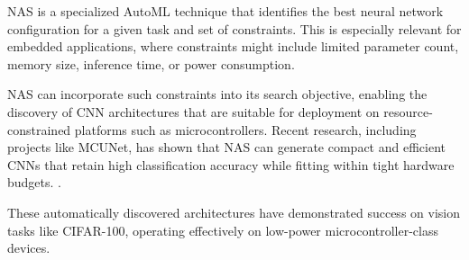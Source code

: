 NAS is a specialized AutoML technique that identifies the best neural network configuration for a given task and set of constraints. This is especially relevant for embedded applications, where constraints might include limited parameter count, memory size, inference time, or power consumption.

NAS can incorporate such constraints into its search objective, enabling the discovery of CNN architectures that are suitable for deployment on resource-constrained platforms such as microcontrollers. Recent research, including projects like MCUNet, has shown that NAS can generate compact and efficient CNNs that retain high classification accuracy while fitting within tight hardware budgets. \cite{pau2023quantitative}.

These automatically discovered architectures have demonstrated success on vision tasks like CIFAR-100, operating effectively on low-power microcontroller-class devices.